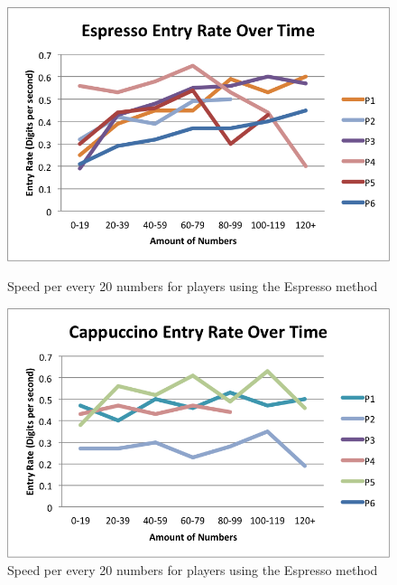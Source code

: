 \begin{figure}[!htbp]
  \centering
  \includegraphics[width=1.0\textwidth]{figures/esp_speed_overtime.png}
  \caption{Speed per every 20 numbers for players using the Espresso method}
  \label{esp_speed_overtime}
  \includegraphics[width=1.0\textwidth]{figures/cap_speed_overtime.png}
  \caption{Speed per every 20 numbers for players using the Espresso method}
  \label{cap_speed_overtime}
\end{figure}

